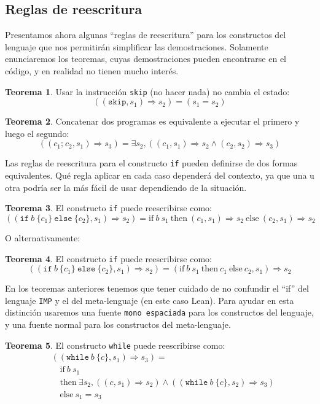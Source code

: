 \documentclass[
  a4paper, 
  10pt, 
  parskip=half, 
  toc=bibliography,
]{scrbook}
\theoremstyle{definition}
\theoremstyle{bolddef}
\newtheorem{theorem}{Teorema}[section]
\newcommand{\ImpIfElse}[3]{\texttt{if} \ {#1} \ \{{#2}\} \ \texttt{else} \ \{{#3}\}}
\newcommand{\ImpWhile}[2]{\texttt{while} \ {#1} \ \{{#2}\}}
\newcommand{\ImpConcat}[2]{{#1} \texttt{;} \ {#2}}
\newcommand{\ImpSkip}{\texttt{skip}}
\newcommand{\LeanIfElse}[3]{\text{if} \ {#1} \ \text{then} \ {#2} \ \text{else} \ {#3}}
\newcommand{\ImpName}{\texttt{IMP}}
\newcommand{\bigstep}{\Longrightarrow}
\begin{document}
\subsection{Reglas de reescritura}

Presentamos ahora algunas \enquote{reglas de reescritura} para los constructos del
lenguaje que nos permitirán simplificar las demostraciones. Solamente enunciaremos
los teoremas, cuyas demostraciones pueden encontrarse en el código, y en realidad no
tienen mucho interés.
\begin{theorem}
  Usar la instrucción \ImpSkip{} (no hacer nada) no cambia el estado:
  \[
  ((\ImpSkip, s_1) \bigstep s_2) = (s_1 = s_2)
  \]
\end{theorem}

\begin{theorem}
  Concatenar dos programas es equivalente a ejecutar el primero y luego el segundo:
  \[
  ((\ImpConcat{c_1}{c_2}, s_1) \bigstep s_3) = 
  \exists s_2, \left((c_1, s_1) \bigstep s_2 \land (c_2, s_2) \bigstep s_3\right)
  \]
\end{theorem}

Las reglas de reescritura para el constructo \texttt{if} pueden definirse de
dos formas equivalentes. Qué regla aplicar en cada caso dependerá del contexto, ya que
una u otra podría ser la más fácil de usar dependiendo de la situación.
\begin{theorem}\label{thm:if_rewrite_1}
  El constructo \texttt{if} puede reescribirse como:
  \[
  ((\ImpIfElse{b}{c_1}{c_2}, s_1) \bigstep s_2) = 
  \LeanIfElse{b \ s_1}{(c_1, s_1) \bigstep s_2}{(c_2, s_1) \bigstep s_2}
  \]
\end{theorem}
O alternativamente:
\begin{theorem}\label{thm:if_rewrite_2}
  El constructo \texttt{if} puede reescribirse como:
  \[
  ((\ImpIfElse{b}{c_1}{c_2}, s_1) \bigstep s_2) =
  (\LeanIfElse{b \ s_1}{c_1}{c_2}, s_1) \bigstep s_2
  \]
\end{theorem}

En los teoremas anteriores tenemos que tener cuidado de no confundir el
\enquote{if} del lenguaje \ImpName{} y el del meta-lenguaje (en este caso Lean).
Para ayudar en esta distinción usaremos una fuente \texttt{mono espaciada} para los
constructos del lenguaje, y una fuente normal para los constructos del
meta-lenguaje.

\begin{theorem}\label{thm:while_rewrite}
  El constructo \texttt{while} puede reescribirse como:
  \begin{align*}
  &((\ImpWhile{b}{c}, s_1) \bigstep s_3) = \\
  &\quad \text{if} \ b \ s_1 \\
  &\quad \text{then} \ \exists s_2, ((c, s_1) \bigstep s_2) \land ((\ImpWhile{b}{c}, s_2) \bigstep s_3) \\
  &\quad \text{else} \ s_1 = s_3
  \end{align*}
\end{theorem}
\end{document}
